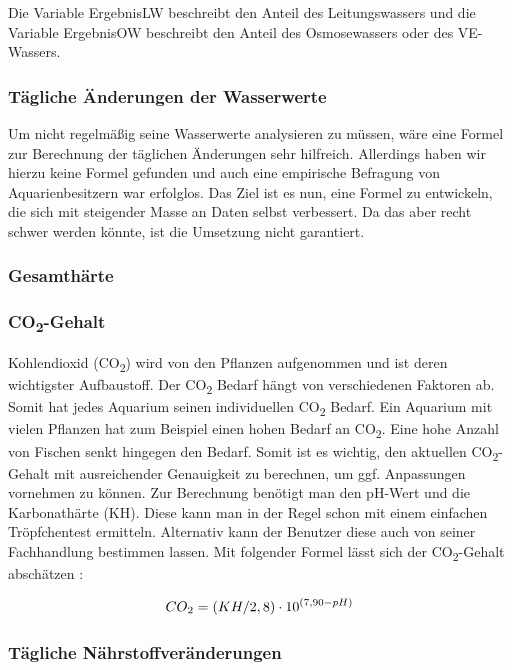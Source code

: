Die Variable ErgebnisLW beschreibt den Anteil des Leitungswassers und die Variable ErgebnisOW beschreibt den Anteil des Osmosewassers oder des VE-Wassers.

\subsubsection{Tägliche Änderungen der Wasserwerte}

Um nicht regelmäßig seine Wasserwerte analysieren zu müssen, wäre eine Formel zur Berechnung der täglichen Änderungen sehr hilfreich. Allerdings haben wir hierzu keine Formel gefunden und auch eine empirische Befragung von Aquarienbesitzern war erfolglos. Das Ziel ist es nun, eine Formel zu entwickeln, die sich mit steigender Masse an Daten selbst verbessert. Da das aber recht schwer werden könnte, ist die Umsetzung nicht garantiert.

\subsubsection{Gesamthärte}

\subsubsection{CO\textsubscript{2}-Gehalt}

Kohlendioxid (CO\textsubscript{2}) wird von den Pflanzen aufgenommen und ist deren wichtigster Aufbaustoff. Der CO\textsubscript{2} Bedarf hängt von verschiedenen Faktoren ab. Somit hat jedes Aquarium seinen individuellen CO\textsubscript{2} Bedarf. Ein Aquarium mit vielen Pflanzen hat zum Beispiel einen hohen Bedarf an CO\textsubscript{2}. Eine hohe Anzahl von Fischen senkt hingegen den Bedarf. Somit ist es wichtig, den aktuellen CO\textsubscript{2}-Gehalt mit ausreichender Genauigkeit zu berechnen, um ggf. Anpassungen vornehmen zu können. Zur Berechnung benötigt man den pH-Wert und die Karbonathärte (KH). Diese kann man in der Regel schon mit einem einfachen Tröpfchentest ermitteln. Alternativ kann der Benutzer diese auch von seiner Fachhandlung bestimmen lassen. Mit folgender Formel lässt sich der CO\textsubscript{2}-Gehalt abschätzen \autocite{Formel:CO2}:

\begin{equation}
CO\textsubscript{2} = (KH/2,8)\cdot10^{(7,90-pH)}
\end{equation}

\subsubsection{Tägliche Nährstoffveränderungen}

